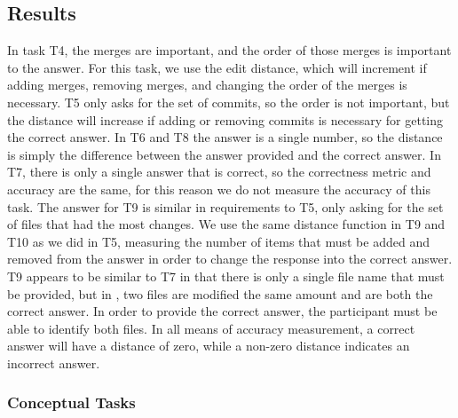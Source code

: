 \subsection{Results}
\label{sec:results}


In task T4, the merges are important, and the order of those
merges is important to the answer. For this task, we use the edit
distance, which will increment if adding merges, removing merges, and
changing the order of the merges is necessary. T5 only asks for the set
of commits, so the order is not important, but the distance will
increase if adding or removing commits is necessary for getting the
correct answer. In T6 and T8 the answer is a single number, so the
distance is simply the difference between the answer provided and the
correct answer. In T7, there is only a single answer that is correct, so
the correctness metric and accuracy are the same, for this reason we do
not measure the accuracy of this task. The answer for T9 is similar in
requirements to T5, only asking for the set of files that had the most
changes. We use the same distance function in T9 and T10 as we did in
T5, measuring the number of items that must be added and removed from
the answer in order to change the response into the correct answer. %
T9 appears to be similar to T7 in that there is only a single file name
that must be provided, but in \comA, two files are modified the same
amount and are both the correct answer. In order to provide the correct
answer, the participant must be able to identify both files. In all
means of accuracy measurement, a correct answer will have a distance of
zero, while a non-zero distance indicates an incorrect answer.


\subsubsection{Conceptual Tasks}
\label{sub:conceptual_tasks}

